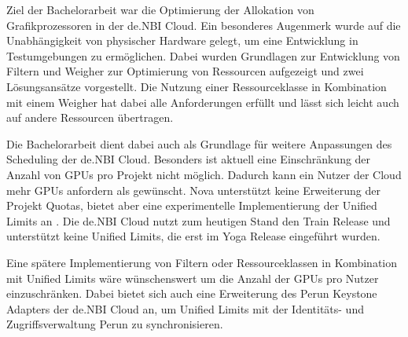 \documentclass[../Main.tex]{subfiles}
\begin{document}
Ziel der Bachelorarbeit war die Optimierung der Allokation von Grafikprozessoren in der de.NBI Cloud.
Ein besonderes Augenmerk wurde auf die Unabhängigkeit von physischer Hardware gelegt, um
eine Entwicklung in Testumgebungen zu ermöglichen.
Dabei wurden Grundlagen zur Entwicklung von Filtern und Weigher zur Optimierung
von Ressourcen aufgezeigt und zwei Lösungsansätze vorgestellt.
Die Nutzung einer Ressourceklasse in Kombination mit einem Weigher hat dabei alle Anforderungen
erfüllt und lässt sich leicht auch auf andere Ressourcen übertragen.

Die Bachelorarbeit dient dabei auch als Grundlage für weitere Anpassungen des Scheduling der de.NBI Cloud.
Besonders ist aktuell eine Einschränkung der Anzahl von GPUs pro Projekt nicht möglich. Dadurch kann ein
Nutzer der Cloud mehr GPUs anfordern als gewünscht. Nova unterstützt keine Erweiterung der Projekt Quotas,
bietet aber eine experimentelle Implementierung der Unified Limits an \citep{UnifiedLimits}. Die de.NBI Cloud
nutzt zum heutigen Stand den Train Release und unterstützt keine Unified Limits, die erst im Yoga Release eingeführt wurden.

Eine spätere Implementierung von Filtern oder Ressourceklassen in Kombination mit Unified Limits
wäre wünschenswert um die Anzahl der GPUs pro Nutzer einzuschränken. Dabei bietet sich auch eine Erweiterung
des Perun Keystone Adapters der de.NBI Cloud an, um Unified Limits mit der Identitäts- und Zugriffsverwaltung
Perun zu synchronisieren.

\biblio %
\end{document}
